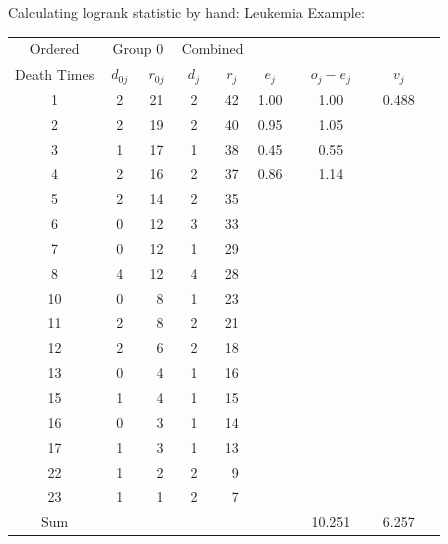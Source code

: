 \documentclass[envcountsect, 10pt, portrait, palatino]{beamer}
\begin{document}
\begin{frame}{Calculating logrank statistic by hand: Leukemia Example:}
\small
\begin{center}
\begin{tabular}{ccccccccc}
\hline
Ordered     & \multicolumn{2}{c}{Group 0} &  \multicolumn{2}{c}{Combined}  \\
\cline{2-3} \cline{4-5}
Death Times & $~d_{0j}~$ & $~r_{0j}~$  & $~d_{j}~$ & $~r_{j}~$ &
     ~$e_j$~ & ~~$o_j-e_j$~~ & ~~$v_j$~~ \\ \hline
  1   &  2    &  21   &    2    &   42  & 1.00 & 1.00 & 0.488\\
  2   &  2    &  19   &    2    &   40  & 0.95 & 1.05 \\
  3   &  1    &  17   &    1    &   38  & 0.45 & 0.55 \\
  4   &  2    &  16   &    2    &   37  & 0.86 & 1.14 \\
  5   &  2    &  14   &    2    &   35  & \\
  6   &  0    &  12   &    3    &   33  & \\
  7   &  0    &  12   &    1    &   29  & \\
  8   &  4    &  12   &    4    &   28  & \\
 10   &  0    &  ~8   &    1    &   23  & \\
 11   &  2    &  ~8   &    2    &   21  & \\
 12   &  2    &  ~6   &    2    &   18  & \\
 13   &  0    &  ~4   &    1    &   16  & \\
 15   &  1    &  ~4   &    1    &   15  & \\
 16   &  0    &  ~3   &    1    &   14  & \\
 17   &  1    &  ~3   &    1    &   13  & \\
 22   &  1    &  ~2   &    2    &   ~9  & \\
 23   &  1    &  ~1   &    2    &   ~7  & \\ \hline
Sum   &       &       &         &       &    & 10.251 & 6.257 \\
\end{tabular}
\end{center}
\normalsize
\end{frame}
\end{document}
